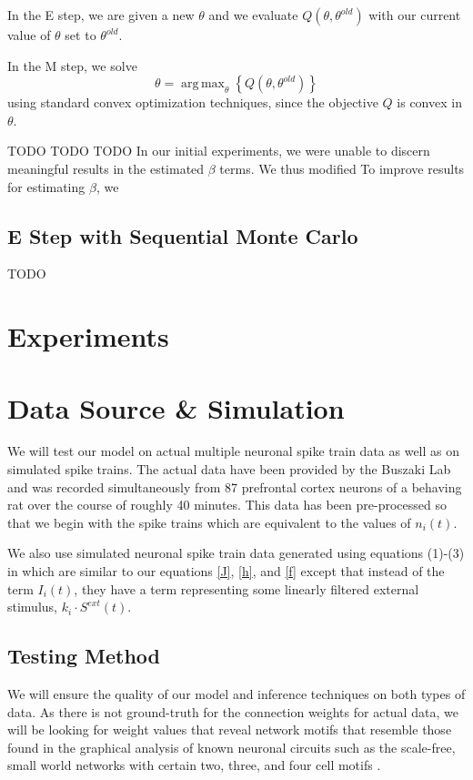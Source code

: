 \documentclass{article}
\DeclareMathOperator*{\argmax}{arg\,max}
\begin{document}
In the E step, we are given a new $\theta$ and we evaluate
$Q(\theta,\theta^{old})$ with our current value of $\theta$
set to $\theta^{old}$.

In the M step, we solve
\begin{equation}
\label{M} \theta = \argmax_{\theta} \left\{ Q(\theta,\theta^{old}) \right\}
\end{equation}
using standard convex optimization techniques, since the objective $Q$ is
convex in $\theta$.

TODO TODO TODO
In our initial experiments, we were unable to discern meaningful results
in the estimated $\beta$ terms. We thus modified 
To improve results for estimating $\beta$, we 

\subsection{E Step with Sequential Monte Carlo}
TODO


\section{Experiments}
\section{Data Source \& Simulation}

We will test our model on actual multiple neuronal spike train data as well as on simulated spike trains. The actual data have been provided by the Buszaki Lab and was recorded simultaneously from 87 prefrontal cortex neurons of a behaving rat over the course of roughly 40 minutes. This data has been pre-processed so that we begin with the spike trains which are equivalent to the values of $n_i(t)$.

We also use simulated neuronal spike train data generated using equations (1)-(3) in \citep{mishchencko2011} which are similar to our equations \eqref{J}, \eqref{h}, and \eqref{f} except that instead of the term $I_i(t)$, they have a term representing some linearly filtered external stimulus, $k_i \cdot S^{ext}(t)$.

\subsection{Testing Method}

We will ensure the quality of our model and inference techniques on both types of data. As there is not ground-truth for the connection weights for actual data, we will be looking for weight values that reveal network motifs that resemble those found in the graphical analysis of known neuronal circuits such as the scale-free, small world networks with certain two, three, and four cell motifs \citep{song2005,perin2011}.
\end{document}
